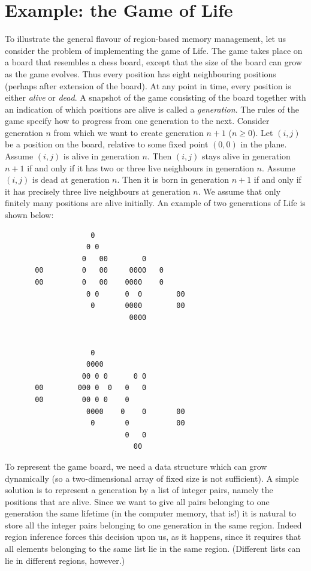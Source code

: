 \documentclass[12pt]{book}
\begin{document}
\section{Example: the Game of Life}
\label{life.sec}
%
To illustrate the general flavour of region-based memory management,
let us consider the problem of implementing the game of Life. The
game takes place on a board that resembles a chess board, except that
the size of the board can grow as the game evolves. Thus every position
has eight neighbouring positions (perhaps after extension of the board). 
At any point in time, every
position is either  {\em alive} or {\em dead}. A snapshot of the game consisting
of the board together with an indication of which positions are alive is called
a {\em generation}. The rules of the game specify how to progress from one
generation to the next. Consider generation $n$ from which we want
to create generation $n+1$ ($n\geq0$). Let $(i,j)$ be a position on
the board, relative to some fixed
point $(0,0)$ in the plane. Assume $(i,j)$ is alive in generation $n$. Then $(i,j)$ stays
alive in generation $n+1$ if and only if it has two or three live neighbours
in generation $n$. Assume $(i,j)$ is dead at generation $n$. Then it
is born in generation $n+1$ if and only if it has precisely three live
neighbours at generation $n$. We assume that only finitely many positions
are alive initially. An example of two generations of Life
is shown below:
\begin{verbatim}
                    0
                   0 0
                  0   00        0
       00         0   00     0000   0
       00         0   00    0000    0
                   0 0      0  0        00
                    0       0000        00
                             0000


                    0
                   0000
                  00 0 0      0 0
       00        000 0  0   0   0
       00         00 0 0    0
                   0000    0    0       00
                    0       0           00
                            0   0
                              00
\end{verbatim}

To represent the game board, we need a data structure 
which can grow dynamically
(so a two-dimensional array of fixed size is not sufficient). 
A simple solution is to represent a generation by a list of integer pairs, namely
the positions that are alive. Since we want to give all pairs belonging
to one generation the same lifetime (in the computer memory, that is!)
it is natural to store all the integer pairs belonging to one generation
in the same region. Indeed region inference forces this decision upon us,
as it happens, since it requires that all elements belonging to the same
list lie in the same region. (Different lists can lie in different regions,
however.)
\end{document}
